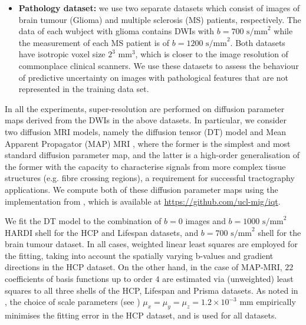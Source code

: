 \begin{itemize}
	\item  \textbf{Pathology dataset:} we use two separate datasets which consist of images of brain tumour (Glioma) \cite{figini2018prediction} and multiple sclerosis (MS) patients, respectively. The data of each wubject with glioma contains DWIs with $b=700 \text{ s/mm}^2$ while the measurement of each MS patient is of $b=1200 \text{ s/mm}^2$. Both datasets have isotropic voxel size $2^3 \text{ mm}^3$, which is closer to the image resolution of commonplace clinical scanners. We use these datasets to assess the behaviour of predictive uncertainty on images with pathological features that are not represented in the training data set.
\end{itemize}

In all the experiments, super-resolution are performed on diffusion parameter maps derived from the DWIs in the above datasets. In particular, we consider two diffusion MRI models, namely the diffusion tensor (DT) model \cite{basser1994mr} and Mean Apparent Propagator (MAP) MRI \cite{ozarslan2013mean}, where the former is the simplest and most standard diffusion parameter map, and the latter is a high-order generalisation of the former with the capacity to characterise signals from more complex tissue structures (e.g. fibre crossing regions), a requirement for successful tractography applications. We compute both of these diffusion parameter maps using the implementation from \cite{alexander2017image}, which is available at \url{https://github.com/ucl-mig/iqt}. 

We fit the DT model to the combination of $b=0$ images and $b=1000  \text{ s/mm}^2$ HARDI shell for the HCP and Lifespan datasets, and $b=700  \text{ s/mm}^2$ shell for the brain tumour dataset. In all cases, weighted linear least squares are employed for the fitting, taking into account the spatially varying b-values and gradient directions in the HCP dataset. On the other hand, in the case of MAP-MRI, $22$ coefficients of basis functions up to order $4$ are estimated via (unweighted) least squares to all three shells of the HCP, Lifespan and Prisma datasets. As noted in \cite{alexander2017image}, the choice of scale parameters (see \cite{ozarslan2013mean}) $\mu_{x} = \mu_{y} = \mu_{z} = 1.2\times 10^{-3}$ mm empirically minimises the fitting error in the HCP dataset, and is used for all datasets. 

